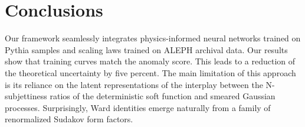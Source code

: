 \section{Conclusions}\label{sec:conclusions}

Our framework seamlessly integrates physics-informed neural networks
trained on Pythia samples and scaling laws trained on ALEPH archival
data. Our results show that training curves match the anomaly score.
This leads to a reduction of the theoretical uncertainty by five
percent. The main limitation of this approach is its reliance on the
latent representations of the interplay between the N-subjettiness
ratios of the deterministic soft function and smeared Gaussian
processes. Surprisingly, Ward identities emerge naturally from a family
of renormalized Sudakov form factors.

